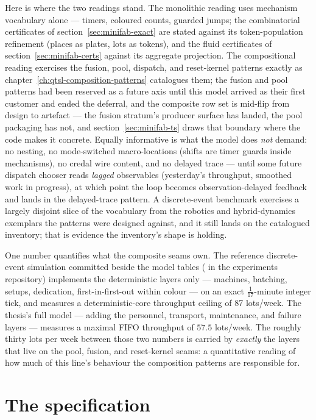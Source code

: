 Here is where the two readings stand. The monolithic reading uses
mechanism vocabulary alone --- timers, coloured counts, guarded
jumps; the combinatorial certificates of
section~\ref{sec:minifab-exact} are stated against its
token-population refinement (places as plates, lots as tokens), and
the fluid certificates of section~\ref{sec:minifab-certs} against
its aggregate projection. The compositional
reading exercises the fusion, pool, dispatch, and reset-kernel
patterns exactly as chapter~\ref{ch:qtsl-composition-patterns}
catalogues them; the fusion and pool patterns had been reserved as a
future axis until this model arrived as their first customer and
ended the deferral, and the composite row set is mid-flip from
design to artefact --- the fusion stratum's producer surface has
landed, the pool packaging has not, and
section~\ref{sec:minifab-ts} draws that boundary where the code
makes it concrete. Equally informative is what the model does
\emph{not} demand: no nesting, no mode-switched macro-locations
(shifts are timer guards inside mechanisms), no credal wire content,
and no delayed trace --- until some future dispatch chooser reads
\emph{lagged} observables (yesterday's throughput, smoothed work in
progress), at which point the loop becomes observation-delayed
feedback and lands in the delayed-trace pattern. A discrete-event
benchmark exercises a largely disjoint slice of the vocabulary from
the robotics and hybrid-dynamics exemplars the patterns were designed
against, and it still lands on the catalogued inventory; that is
evidence the inventory's shape is holding.

One number quantifies what the composite seams own. The reference
discrete-event simulation committed beside the model tables
( in the experiments repository) implements
the deterministic layers only --- machines, batching, setups,
dedication, first-in-first-out within colour --- on an exact
$\tfrac{1}{17}$-minute integer tick, and measures a
deterministic-core throughput ceiling of 87 lots/week. The thesis's
full model --- adding the personnel, transport, maintenance, and
failure layers --- measures a maximal FIFO throughput of $57.5$
lots/week. The roughly thirty lots per week between those two numbers
is carried by \emph{exactly} the layers that live on the pool, fusion,
and reset-kernel seams: a quantitative reading of how much of this
line's behaviour the composition patterns are responsible for.

\section{The specification}
\label{sec:minifab-spec}

